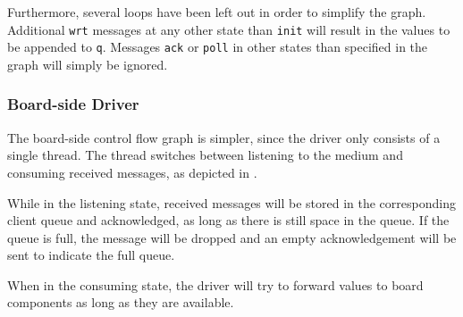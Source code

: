 \documentclass{report}
\begin{document}
Furthermore, several loops have been left out in order to simplify the graph. Additional \texttt{wrt} messages at any other state than \texttt{init} will result in the values to be appended to \texttt{q}. Messages \texttt{ack} or \texttt{poll} in other states than specified in the graph will simply be ignored.
%
%
%
%

\subsubsection{Board-side Driver}
The board-side control flow graph is simpler, since the driver only consists of a single thread. The thread switches between listening to the medium and consuming received messages, as depicted in .

While in the listening state, received messages will be stored in the corresponding client queue and acknowledged, as long as there is still space in the queue. If the queue is full, the message will be dropped and an empty acknowledgement will be sent to indicate the full queue.

When in the consuming state, the driver will try to forward values to board components as long as they are available.
\end{document}
